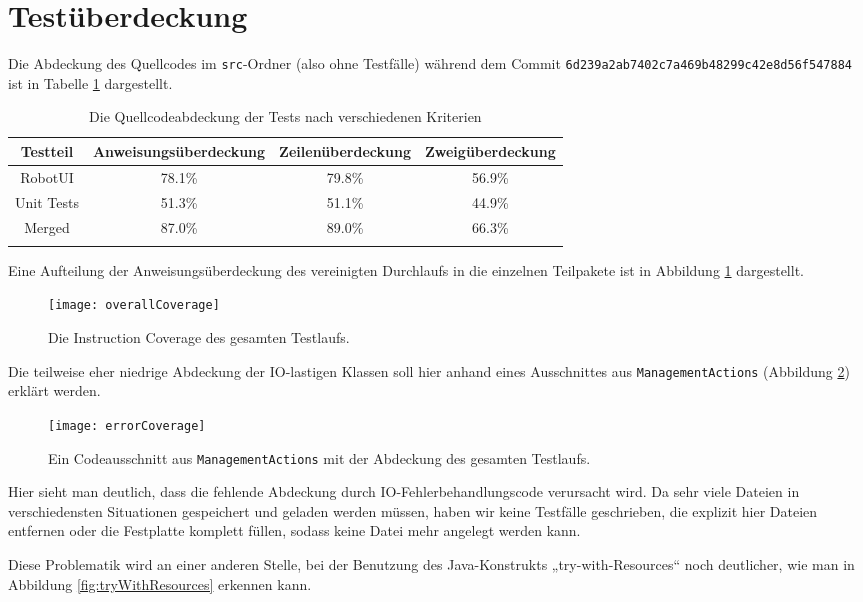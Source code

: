 \documentclass[a4paper, 11pt]{article}
\newcommand{\code}[1]{\texttt{#1}}
\begin{document}
\section{Testüberdeckung}
Die Abdeckung des Quellcodes im \code{src}-Ordner (also ohne Testfälle) während dem Commit \code{6d239a2ab7402c7a469b48299c42e8d56f547884} ist in Tabelle \ref{tab:coverageData} dargestellt.\\
\begin{longtable}{||c|c|c|c||}
Testteil & Anweisungsüberdeckung & Zeilenüberdeckung & Zweigüberdeckung\\ \hline\hline
RobotUI & 78.1\%&79.8\%&56.9\%\\ \hline
Unit Tests & 51.3\%&51.1\%&44.9\%\\ \hline \hline
Merged & 87.0\%&89.0\%&66.3\%\\ \hline
\caption{Die Quellcodeabdeckung der Tests nach verschiedenen Kriterien}
\label{tab:coverageData}
\end{longtable}

Eine Aufteilung der Anweisungsüberdeckung des vereinigten Durchlaufs in die einzelnen Teilpakete ist in Abbildung \ref{fig:overallCoverage} dargestellt.
\begin{figure}[h]
\texttt{[image: overallCoverage]}
\caption{Die Instruction Coverage des gesamten Testlaufs.}
\label{fig:overallCoverage}
\end{figure}

Die teilweise eher niedrige Abdeckung der IO-lastigen Klassen soll hier
anhand eines Ausschnittes aus \code{ManagementActions} (Abbildung \ref{fig:errorCoverage}) erklärt werden.

\begin{figure}[h]
\texttt{[image: errorCoverage]}
\caption{Ein Codeausschnitt aus \code{ManagementActions} mit der Abdeckung des gesamten Testlaufs.}
\label{fig:errorCoverage}
\end{figure}

Hier sieht man deutlich, dass die fehlende Abdeckung durch IO-Fehlerbehandlungscode verursacht wird. Da sehr viele Dateien in verschiedensten Situationen gespeichert und geladen werden müssen, haben wir keine Testfälle geschrieben, die explizit hier Dateien entfernen oder die Festplatte komplett füllen, sodass keine Datei mehr angelegt werden kann.

Diese Problematik wird an einer anderen Stelle, bei der Benutzung des Java-Konstrukts „try-with-Resources“ noch deutlicher, wie man in Abbildung \ref{fig:tryWithResources} erkennen kann.
\end{document}
